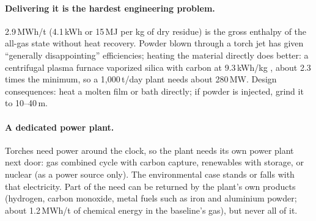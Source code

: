 \documentclass[11pt,a4paper]{article}
\begin{document}
\paragraph{Delivering it is the hardest engineering problem.} 2.9\,MWh/t (4.1\,kWh or 15\,MJ per kg of dry residue) is the gross enthalpy of the all-gas state without heat recovery. Powder blown through a torch jet has given ``generally disappointing'' efficiencies; heating the material directly does better: a centrifugal plasma furnace vaporized silica with carbon at 9.3\,kWh/kg \citep{sayce1976}, about 2.3 times the minimum, so a 1,000\,t/day plant needs about 280\,MW. Design consequences: heat a molten film or bath directly; if powder is injected, grind it to 10--40\,\textmu m.
\paragraph{A dedicated power plant.} Torches need power around the clock, so the plant needs its own power plant next door: gas combined cycle with carbon capture, renewables with storage, or nuclear (as a power source only). The environmental case stands or falls with that electricity. Part of the need can be returned by the plant's own products (hydrogen, carbon monoxide, metal fuels such as iron and aluminium powder; about 1.2\,MWh/t of chemical energy in the baseline's gas), but never all of it.
\end{document}
